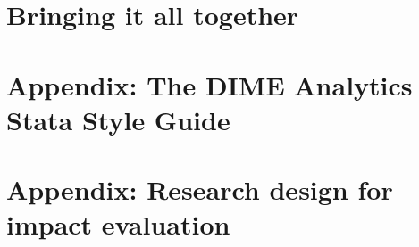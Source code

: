 


\chapter*{Bringing it all together} %




\chapter{Appendix: The DIME Analytics Stata Style Guide}
\label{ap:1}





\chapter{Appendix: Research design for impact evaluation}
\label{ap:1}




\backmatter




\printindex %


